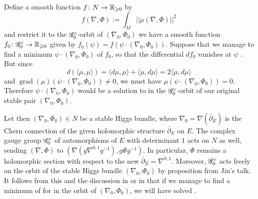 \documentclass[A4paper, 12pt, british, reqno]{amsart}
\DeclareMathOperator{\grad}{grad}
\newcommand{\1}{\mathbbm{1}}
\begin{document}
Define a smooth function $f\colon N\to \mathbb{R}_{\geqslant 0}$ by
\[ f(\nabla,\Phi):=\int_{M}||\mu(\nabla,\Phi)||^{2} \]
and restrict it to the $\mathscr{G}^{c}_{0}$-orbit of $(\nabla_{0},\Phi_{0})$ we have a smooth function $f_{0}\colon \mathscr{G}^{c}_{0}\to \mathbb{R}_{\geqslant 0}$ given by $f_{0}(\psi)=f(\psi\cdot (\nabla_{0},\Phi_{0}))$.
Suppose that we manage to find a minimum $\psi\cdot (\nabla_{0},\Phi_{0})$ of $f_{0}$, so that the differential $df_{0}$ vanishes at $\psi$ \cite[Exercise 11.24]{lee13}.
But since
\[ d(\langle \mu,\mu\rangle)=\langle d\mu,\mu\rangle+\langle \mu,d\mu\rangle =2\langle \mu, d\mu\rangle \]
and $\grad(\mu)(\psi\cdot (\nabla_{0},\Phi_{0}))\neq 0$, we must have $\mu(\psi\cdot (\nabla_{0},\Phi_{0}))=0$.
Therefore $\psi \cdot (\nabla_{0},\Phi_{0})$ would be a solution to  in the $\mathscr{G}^{c}_{0}$-orbit of our original stable pair $(\nabla_{0},\Phi_{0})$.

Let then $(\nabla_{0},\Phi_{0})\in N$ be a stable Higgs bundle, where $\nabla_{0}=\nabla(\bar{\partial}_{E})$ is the Chern connection of the given holomorphic structure $\bar{\partial}_{E}$ on $E$.
The complex gauge group $\mathscr{G}^{c}_{0}$ of automorphisms of $E$ with determinant $1$ acts on $N$ as well, sending $(\nabla,\Phi)$ to $(\nabla(g\nabla^{0,1}g^{-1}),g\Phi g^{-1})$.
In particular, $\Phi$ remains a holomorphic section with respect to the new $\bar{\partial}_{E}=\nabla^{0,1}$.
Moreover, $\mathscr{G}^{c}_{0}$ acts freely on the orbit of the stable Higgs bundle $(\nabla_{0},\Phi_{0})$ by proposition \cite[(3.15)]{hit87a} from Jin's talk.
It follows from this and the discussion in \cite[\S 4]{hit87a} or in \cite[\S 8]{ab83} that if we manage to find a minimum of for
in the orbit of $(\nabla_{0},\Phi_{0})$, we will have solved .
\end{document}
